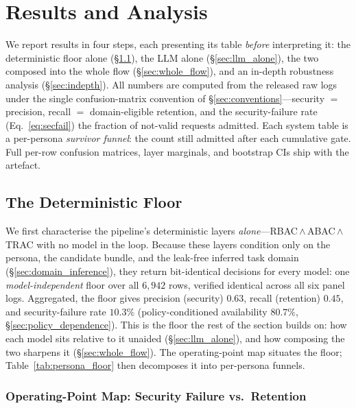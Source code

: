 \documentclass[sigconf,review,anonymous]{acmart}
\begin{document}
\FloatBarrier
\section{Results and Analysis}
\label{sec:results}

We report results in four steps, each presenting its table \emph{before} interpreting it: the deterministic floor alone (\S\ref{sec:det_floor}), the LLM alone (\S\ref{sec:llm_alone}), the two composed into the whole flow (\S\ref{sec:whole_flow}), and an in-depth robustness analysis (\S\ref{sec:indepth}). All numbers are computed from the released raw logs under the single confusion-matrix convention of \S\ref{sec:conventions}---security $=$ precision, recall $=$ domain-eligible retention, and the security-failure rate (Eq.~\ref{eq:secfail}) the fraction of not-valid requests admitted. Each system table is a per-persona \emph{survivor funnel}: the count still admitted after each cumulative gate. Full per-row confusion matrices, layer marginals, and bootstrap CIs ship with the artefact.

\subsection{The Deterministic Floor}
\label{sec:det_floor}

We first characterise the pipeline's deterministic layers \emph{alone}---RBAC\,$\wedge$\,ABAC\,$\wedge$\,TRAC with no model in the loop. Because these layers condition only on the persona, the candidate bundle, and the leak-free inferred task domain (\S\ref{sec:domain_inference}), they return bit-identical decisions for every model: one \emph{model-independent} floor over all $6{,}942$ rows, verified identical across all six panel logs. Aggregated, the floor gives precision (security) $0.63$, recall (retention) $0.45$, and security-failure rate $10.3\%$ (policy-conditioned availability $80.7\%$, \S\ref{sec:policy_dependence}). This is the floor the rest of the section builds on: how each model sits relative to it unaided (\S\ref{sec:llm_alone}), and how composing the two sharpens it (\S\ref{sec:whole_flow}). The operating-point map situates the floor; Table~\ref{tab:persona_floor} then decomposes it into per-persona funnels.

\subsubsection{Operating-Point Map: Security Failure vs.\ Retention}
\label{sec:operating_sweep}
\end{document}

